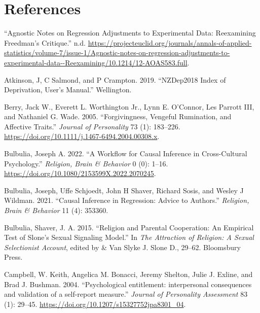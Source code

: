 \documentclass[
  singlecolumn]{report}
\newlength{\cslhangindent}
\newlength{\cslentryspacingunit} %
\newenvironment{CSLReferences}[2] %
 {%
  \setlength{\parindent}{0pt}
  \ifodd #1
  \let\oldpar\par
  \def\par{\hangindent=\cslhangindent\oldpar}
  \fi
  \setlength{\parskip}{#2\cslentryspacingunit}
 }%
 {}
\begin{document}
\hypertarget{references}{%
\section*{References}\label{references}}

\hypertarget{refs}{}
\begin{CSLReferences}{1}{0}
\leavevmode{}%
{``Agnostic Notes on Regression Adjustments to Experimental Data:
Reexamining Freedman{'}s Critique.''} n.d.
\url{https://projecteuclid.org/journals/annals-of-applied-statistics/volume-7/issue-1/Agnostic-notes-on-regression-adjustments-to-experimental-data--Reexamining/10.1214/12-AOAS583.full}.

\leavevmode{}%
Atkinson, J, C Salmond, and P Crampton. 2019. {``NZDep2018 Index of
Deprivation, User{'}s Manual.''} Wellington.

\leavevmode{}%
Berry, Jack W., Everett L. Worthington Jr., Lynn E. O'Connor, Les
Parrott III, and Nathaniel G. Wade. 2005. {``Forgivingness, Vengeful
Rumination, and Affective Traits.''} \emph{Journal of Personality} 73
(1): 183--226. \url{https://doi.org/10.1111/j.1467-6494.2004.00308.x}.

\leavevmode{}%
Bulbulia, Joseph A. 2022. {``A Workflow for Causal Inference in
Cross-Cultural Psychology.''} \emph{Religion, Brain \& Behavior} 0 (0):
1--16. \url{https://doi.org/10.1080/2153599X.2022.2070245}.

\leavevmode{}%
Bulbulia, Joseph, Uffe Schjoedt, John H Shaver, Richard Sosis, and
Wesley J Wildman. 2021. {``Causal Inference in Regression: Advice to
Authors.''} \emph{Religion, Brain \& Behavior} 11 (4): 353360.

\leavevmode{}%
Bulbulia, Shaver, J. A. 2015. {``Religion and Parental Cooperation: An
Empirical Test of Slone's Sexual Signaling Model.''} In \emph{The
Attraction of Religion: A Sexual Selectionist Account}, edited by \& Van
Slyke J. Slone D., 29--62. Bloomsbury Press.

\leavevmode{}%
Campbell, W. Keith, Angelica M. Bonacci, Jeremy Shelton, Julie J.
Exline, and Brad J. Bushman. 2004. {``Psychological entitlement:
interpersonal consequences and validation of a self-report measure.''}
\emph{Journal of Personality Assessment} 83 (1): 29--45.
\url{https://doi.org/10.1207/s15327752jpa8301_04}.


\end{CSLReferences}
\end{document}
